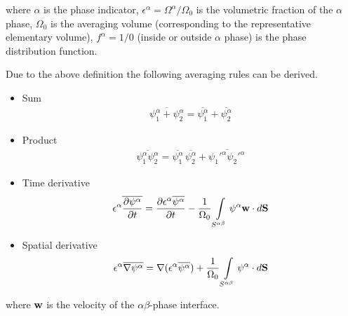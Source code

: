 where $\alpha$ is the phase indicator, $\epsilon^\alpha =
\Omega^\alpha/\Omega_0$ is the volumetric fraction of the $\alpha$
phase, $\Omega_0$ is the averaging volume (corresponding to the
representative elementary volume), $f^\alpha=1/0$ (inside or
outside $\alpha$ phase) is the phase distribution function.


Due to the above definition the following averaging rules can be derived.

\begin{itemize}
 \item Sum
\begin{eqnarray}
\overline{\psi_1^\alpha+\psi_2^\alpha}
=
\overline{\psi_1^\alpha}+\overline{\psi_2^\alpha}
\end{eqnarray}

 \item Product
\begin{eqnarray}
\overline{\psi_1^\alpha \psi_2^\alpha}
=
\overline{\psi_1^\alpha}\,\overline{\psi_2^\alpha}
+
\overline{{\psi_1'}^\alpha {\psi_2'}^\alpha}
\end{eqnarray}

 \item Time derivative
\begin{eqnarray}
\epsilon^\alpha \overline{\frac{\partial \psi^\alpha}{\partial t}}
=
\frac{\partial \epsilon^\alpha \overline{\psi^\alpha}}{\partial t}
-
\frac{1}{\Omega_0}
\int\limits_{S^{\alpha\beta}}\psi^\alpha {\bf w} \cdot d{\bf S}
\end{eqnarray}

 \item Spatial derivative
\begin{eqnarray}
\epsilon^\alpha \overline{\nabla\psi^\alpha}
=
\nabla(\epsilon^\alpha\overline{\psi^\alpha})
+
\frac{1}{\Omega_0}
\int\limits_{S^{\alpha\beta}}\psi^\alpha \cdot d{\bf S}
\end{eqnarray}

\end{itemize}

where $\bf w$ is the velocity of the $\alpha\beta$-phase interface.


